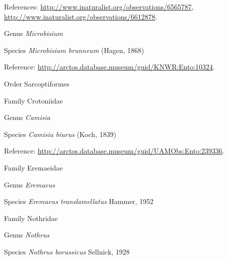\documentclass[9pt, article]{memoir}
\begin{document}
\begin{multicols}{2}
\vspace{6pt}References: 
\url{http://www.inaturalist.org/observations/6565787}, 
\url{http://www.inaturalist.org/observations/6612878}.

\vspace{6pt}\noindent\hspace{30pt}Genus \textit{Microbisium}


\vspace{6pt}\noindent\hspace{36pt}Species \textit{Microbisium brunneum} (Hagen, 1868)


\vspace{6pt}Reference: 
\url{http://arctos.database.museum/guid/KNWR:Ento:10324}.

\vspace{6pt}\noindent\hspace{18pt}Order Sarcoptiformes


\vspace{6pt}\noindent\hspace{24pt}Family Crotoniidae


\vspace{6pt}\noindent\hspace{30pt}Genus \textit{Camisia}


\vspace{6pt}\noindent\hspace{36pt}Species \textit{Camisia biurus} (Koch, 1839)


\vspace{6pt}Reference: 
\url{http://arctos.database.museum/guid/UAMObs:Ento:239336}.

\vspace{6pt}\noindent\hspace{24pt}Family Eremaeidae


\vspace{6pt}\noindent\hspace{30pt}Genus \textit{Eremaeus}


\vspace{6pt}\noindent\hspace{36pt}Species \textit{Eremaeus translamellatus} Hammer, 1952


\vspace{6pt}\noindent\hspace{24pt}Family Nothridae


\vspace{6pt}\noindent\hspace{30pt}Genus \textit{Nothrus}


\vspace{6pt}\noindent\hspace{36pt}Species \textit{Nothrus borussicus} Sellnick, 1928



\end{multicols}
\end{document}
